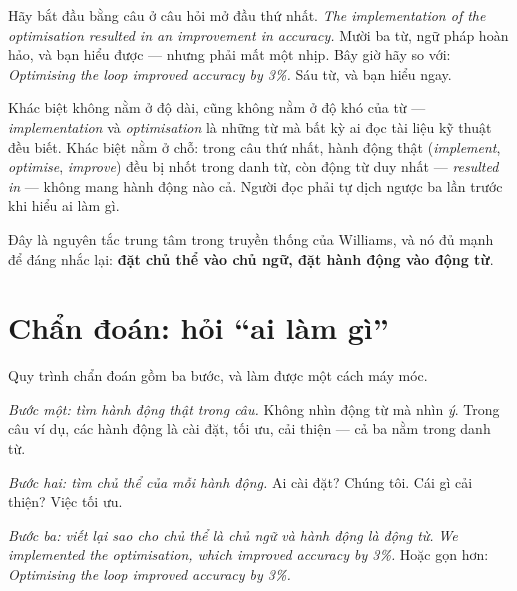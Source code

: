 \documentclass[../../english.tex]{subfiles}
\begin{document}
Hãy bắt đầu bằng câu ở câu hỏi mở đầu thứ nhất. \emph{The implementation of the optimisation resulted in an improvement in accuracy.} Mười ba từ, ngữ pháp hoàn hảo, và bạn hiểu được --- nhưng phải mất một nhịp. Bây giờ hãy so với: \emph{Optimising the loop improved accuracy by 3\%.} Sáu từ, và bạn hiểu ngay.

Khác biệt không nằm ở độ dài, cũng không nằm ở độ khó của từ --- \emph{implementation} và \emph{optimisation} là những từ mà bất kỳ ai đọc tài liệu kỹ thuật đều biết. Khác biệt nằm ở chỗ: trong câu thứ nhất, hành động thật (\emph{implement}, \emph{optimise}, \emph{improve}) đều bị nhốt trong danh từ, còn động từ duy nhất --- \emph{resulted in} --- không mang hành động nào cả. Người đọc phải tự dịch ngược ba lần trước khi hiểu ai làm gì.

Đây là nguyên tắc trung tâm trong truyền thống của Williams\cite{williams2016}, và nó đủ mạnh để đáng nhắc lại: \textbf{đặt chủ thể vào chủ ngữ, đặt hành động vào động từ}.

\section{Chẩn đoán: hỏi ``ai làm gì''}

Quy trình chẩn đoán gồm ba bước, và làm được một cách máy móc.

\emph{Bước một: tìm hành động thật trong câu.} Không nhìn động từ mà nhìn \emph{ý}. Trong câu ví dụ, các hành động là cài đặt, tối ưu, cải thiện --- cả ba nằm trong danh từ.

\emph{Bước hai: tìm chủ thể của mỗi hành động.} Ai cài đặt? Chúng tôi. Cái gì cải thiện? Việc tối ưu.

\emph{Bước ba: viết lại sao cho chủ thể là chủ ngữ và hành động là động từ.} \emph{We implemented the optimisation, which improved accuracy by 3\%.} Hoặc gọn hơn: \emph{Optimising the loop improved accuracy by 3\%.}

\begin{capdoi}
\end{capdoi}
\end{document}
